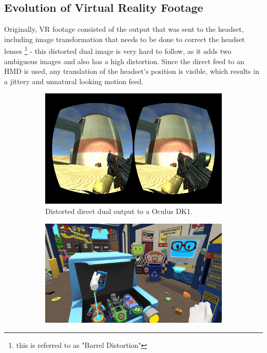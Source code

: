 \subsection{Evolution of Virtual Reality Footage}

Originally, VR footage consisted of the output that was sent to the headset, 
including image transformation that needs to be done to correct the headset 
lenses \footnote{this is referred to as "Barrel Distortion"} - this distorted 
dual image is very hard to follow, as it adds two ambiguous images and also has 
a high distortion. Since the direct feed to an HMD is used, any 
translation of the headset's position is visible, which results in a jittery 
and unnatural looking motion feed.

\begin{figure}[htbp]
	\label{fig:evolution:steps}
	\begin{subfigure}[t]{.45\textwidth}
		\centering
		\includegraphics[width=\textwidth]{_external/media/torque3d-bdist.jpg}
		\caption{Distorted direct dual output to a Oculus 
		DK1\cite{wyand:torqu3d:2013}.}
	\end{subfigure}
	\begin{subfigure}[t]{.45\textwidth}
		\centering
		\includegraphics[width=\textwidth]{_external/media/owlch-car.jpg}

\end{subfigure}
\end{figure}
